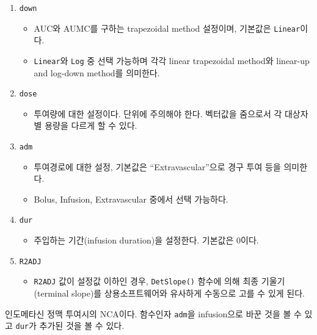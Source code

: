 \documentclass[
  11pt,
  krantz2, a4paper, twoside]{krantz}
\providecommand{\tightlist}{%
  \setlength{\itemsep}{0pt}\setlength{\parskip}{0pt}}
\theoremstyle{definition}
\theoremstyle{definition}
\theoremstyle{definition}
\theoremstyle{definition}
\theoremstyle{remark}
\begin{document}
\begin{enumerate}
\def\labelenumi{\arabic{enumi}.}
\tightlist
\item
  \texttt{down}

  \begin{itemize}
  \tightlist
  \item
    AUC와 AUMC를 구하는 trapezoidal method 설정이며, 기본값은 \texttt{Linear}이다.
  \item
    \texttt{Linear}와 \texttt{Log} 중 선택 가능하며 각각 linear trapezoidal method와 linear-up and log-down method를 의미한다.
  \end{itemize}
\item
  \texttt{dose}

  \begin{itemize}
  \tightlist
  \item
    투여량에 대한 설정이다. 단위에 주의해야 한다. 벡터값을 줌으로서 각 대상자별 용량을 다르게 할 수 있다.
  \end{itemize}
\item
  \texttt{adm}

  \begin{itemize}
  \tightlist
  \item
    투여경로에 대한 설정, 기본값은 ``Extravascular''으로 경구 투여 등을 의미한다.
  \item
    Bolus, Infusion, Extravascular 중에서 선택 가능하다.
  \end{itemize}
\item
  \texttt{dur}

  \begin{itemize}
  \tightlist
  \item
    주입하는 기간(infusion duration)을 설정한다. 기본값은 0이다.
  \end{itemize}
\item
  \texttt{R2ADJ}

  \begin{itemize}
  \tightlist
  \item
    \texttt{R2ADJ} 값이 설정값 이하인 경우, \texttt{DetSlope()} 함수에 의해 최종 기울기(terminal slope)를 상용소프트웨어와 유사하게 수동으로 고를 수 있게 된다.
  \end{itemize}
\end{enumerate}

인도메타신 정맥 투여시의 NCA이다. 함수인자 \texttt{adm}을 infusion으로 바꾼 것을 볼 수 있고 \texttt{dur}가 추가된 것을 볼 수 있다.
\end{document}
